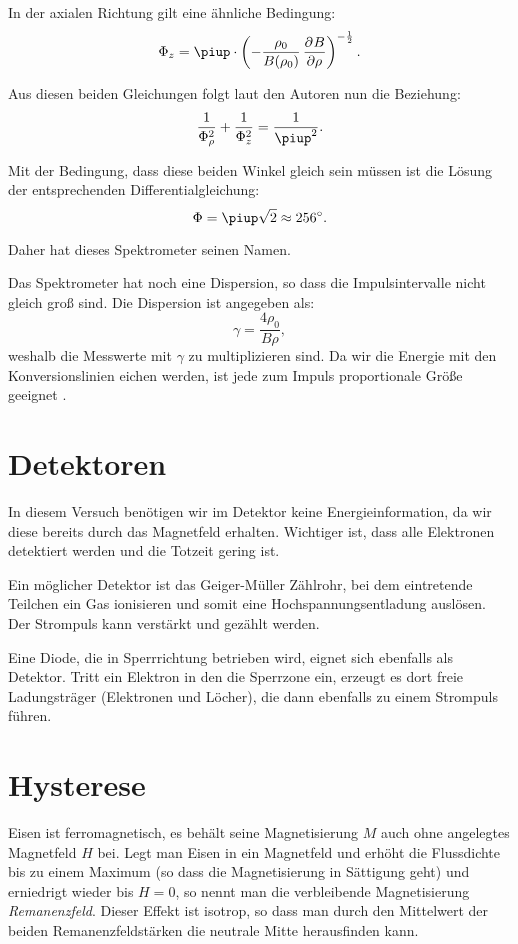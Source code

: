In der axialen Richtung gilt eine ähnliche Bedingung:
\parencite[(126)]{Riezler/Kernphysikalisches}
\[
    \Phi_z = \piup \cdot \del{- \frac{\rho_0}{B(\rho_0)} \dpd B
    \rho}^{-\frac 12}.
\]

Aus diesen beiden Gleichungen folgt laut den Autoren nun die Beziehung:
\parencite[(127)]{Riezler/Kernphysikalisches}
\[
    \frac1{\Phi_\rho^2} + \frac1{\Phi_z^2} = \frac1{\piup^2}.
\]

Mit der Bedingung, dass diese beiden Winkel gleich sein müssen ist die Lösung
der entsprechenden Differentialgleichung:
\parencite[(129)]{Riezler/Kernphysikalisches}
\[
    \Phi = \piup \sqrt 2 \approx \SI{256}{\degree}.
\]

Daher hat dieses Spektrometer seinen Namen.

Das Spektrometer hat noch eine Dispersion, so dass die Impulsintervalle nicht
gleich groß sind. Die Dispersion ist angegeben als:
\parencite[(130)]{Riezler/Kernphysikalisches}
\[
    \gamma = \frac{4 \rho_0}{B \rho},
\]
weshalb die Messwerte mit $\gamma$ zu multiplizieren sind. Da wir die Energie
mit den Konversionslinien eichen werden, ist jede zum Impuls proportionale
Größe geeignet \parencite[§P523.5.4]{physik512-Anleitung}.

\section{Detektoren}

In diesem Versuch benötigen wir im Detektor keine Energieinformation, da wir
diese bereits durch das Magnetfeld erhalten. Wichtiger ist, dass alle
Elektronen detektiert werden und die Totzeit gering ist.

Ein möglicher Detektor ist das Geiger-Müller Zählrohr, bei dem eintretende
Teilchen ein Gas ionisieren und somit eine Hochspannungsentladung auslösen. Der
Strompuls kann verstärkt und gezählt werden.

Eine Diode, die in Sperrrichtung betrieben wird, eignet sich ebenfalls als
Detektor. Tritt ein Elektron in den die Sperrzone ein, erzeugt es dort freie
Ladungsträger (Elektronen und Löcher), die dann ebenfalls zu einem Strompuls
führen.

\section{Hysterese}

Eisen ist ferromagnetisch, es behält seine Magnetisierung $M$ auch ohne
angelegtes Magnetfeld $H$ bei. Legt man Eisen in ein Magnetfeld und erhöht die
Flussdichte bis zu einem Maximum (so dass die Magnetisierung in Sättigung geht)
und erniedrigt wieder bis $H = 0$, so nennt man die verbleibende Magnetisierung
\emph{Remanenzfeld}. Dieser Effekt ist isotrop, so dass man durch den
Mittelwert der beiden Remanenzfeldstärken die neutrale Mitte herausfinden kann.

